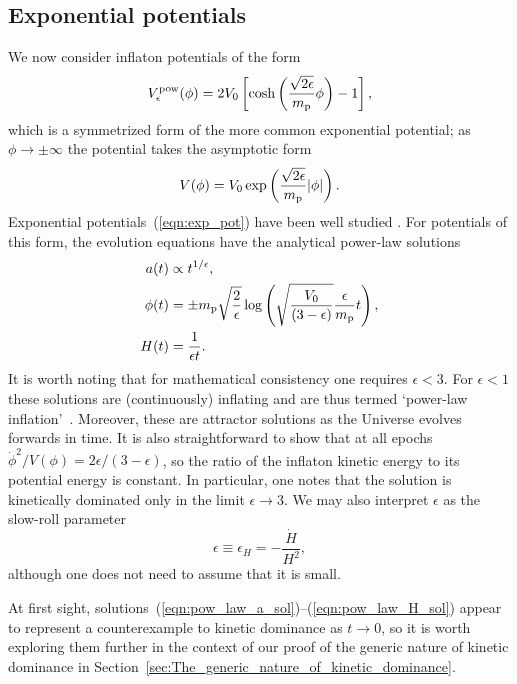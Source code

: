 \subsection{Exponential potentials}
\label{sec:Exponential_potentials}
We now consider inflaton potentials of the form 
%
\begin{equation}
  V^\mathrm{pow}_\epsilon(\phi) 
  = 
  2V_0\left[
  \cosh\left(\frac{\sqrt{2\epsilon}}{m_{\mathrm{p}}}\phi\right)-1
  \right],
  \label{eqn:coshpot}
\end{equation}
%
which is a symmetrized form of the more common exponential potential; as $\phi\rightarrow\pm\infty$ the potential takes the asymptotic form
%
\begin{equation}
  V(\phi) 
  = 
  V_0 \exp\left(\frac{\sqrt{2\epsilon}}{m_{\mathrm{p}}} |\phi|\right).
  \label{eqn:exp_pot}
\end{equation}
%
Exponential potentials~(\ref{eqn:exp_pot}) have been well studied \citep{yokoyama_dynamics_1988}. For potentials of this form, the evolution equations have the analytical power-law solutions
%
\begin{align}
  a(t) 
  &\propto 
  {t}^{1/\epsilon},
  \label{eqn:pow_law_a_sol}
  \\
  \phi(t)
  &=
  \pm m_{\mathrm{p}}\sqrt{\frac{2}{\epsilon}}
  \log\left(\sqrt{\frac{V_0}{\left(3-\epsilon\right)}}
  \frac{\epsilon}{m_{\mathrm{p}}} t\right),
  \\
  H(t)
  &=
  \frac{1}{\epsilon t}.  
  \label{eqn:pow_law_H_sol}
\end{align}
%
It is worth noting that for mathematical consistency one requires $\epsilon < 3$. For $\epsilon<1$ these solutions are (continuously) inflating and are thus termed `power-law inflation'~\citep{lucchin_power-law_1985}. Moreover, these are attractor solutions as the Universe evolves forwards in time. It is also straightforward to show that at all epochs $\dot{\phi}^2/V(\phi) = 2\epsilon/(3-\epsilon)$, so the ratio of the inflaton kinetic energy to its potential energy is constant. In particular, one notes that the solution is kinetically dominated only in the limit $\epsilon \to 3$.  We may also interpret $\epsilon$ as the slow-roll parameter 
%
\begin{equation}
  \epsilon\equiv\epsilon_H = -\frac{\dot{H}}{H^2},
\end{equation}
%
although one does not need to assume that it is small.

At first sight, solutions~(\ref{eqn:pow_law_a_sol})--(\ref{eqn:pow_law_H_sol}) appear to represent a counterexample to kinetic dominance as $t \to 0$, so it is worth exploring them further in the context of our proof of the generic nature of kinetic dominance in Section~\ref{sec:The_generic_nature_of_kinetic_dominance}. 

